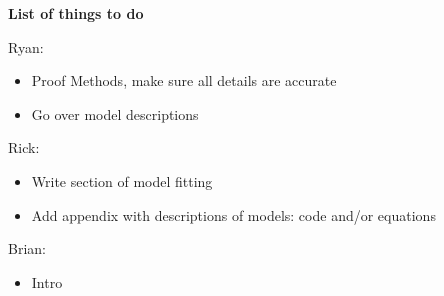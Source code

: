 \textbf{List of things to do}

Ryan:
\begin{itemize}
\item Proof Methods, make sure all details are accurate
\item Go over model descriptions
\end{itemize}
Rick:
\begin{itemize}
\item Write section of model fitting
\item Add appendix with descriptions of models: code and/or equations
\end{itemize}

Brian:
\begin{itemize}
\item Intro
\end{itemize}
